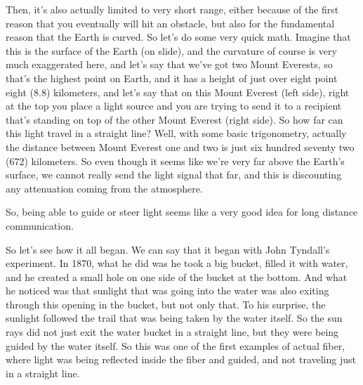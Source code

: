 Then, it's also actually limited to very short range, either because of the first reason that you eventually will hit an obstacle, but also for the fundamental reason that the Earth is curved. So let's do some very quick math. Imagine that this is the surface of the Earth (on slide), and the curvature of course is very much exaggerated here, and let's say that we've got two Mount Everests, so that's the highest point on Earth, and it has a height of just over eight point eight (8.8) kilometers, and let's say that on this Mount Everest (left side), right at the top you place a light source and you are trying to send it to a recipient that's standing on top of the other Mount Everest (right side). So how far can this light travel in a straight line? Well, with some basic trigonometry, actually the distance between Mount Everest one and two is just six hundred seventy two (672) kilometers. So even though it seems like we're very far above the Earth's surface, we cannot really send the light signal that far, and this is discounting any attenuation coming from the atmosphere.

So, being able to guide or steer light seems like a very good idea for long distance communication.

So let's see how it all began. We can say that it began with John Tyndall's experiment. In 1870, what he did was he took a big bucket, filled it with water, and he created a small hole on one side of the bucket at the bottom. And what he noticed was that sunlight that was going into the water was also exiting through this opening in the bucket, but not only that. To his surprise, the sunlight followed the trail that was being taken by the water itself. So the sun rays did not just exit the water bucket in a straight line, but they were being guided by the water itself. So this was one of the first examples of actual fiber, where light was being reflected inside the fiber and guided, and not traveling just in a straight line.

